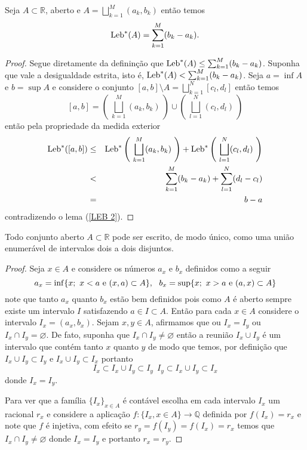 \begin{lema}\label{LEB 3}
Seja $A\subset \mathbb{R}$,  aberto e $A=\bigsqcup_{k=1}^M(a_k,b_k)$ então temos 
$$
\textnormal{Leb}^{*}(A)=\sum_{k=1}^M(b_k-a_k).
$$
\end{lema}

\begin{proof}
Segue diretamente da defininção que 
$\textnormal{Leb}^{*}(A)\leq\sum_{k=1}^M(b_k-a_k)$. 
Suponha que vale a desigualdade estrita, 
isto é, $\textnormal{Leb}^{*}(A)<\sum_{k=1}^M(b_k-a_k)$. 
Seja $a=\inf A$ e $b=\sup A$
e considere o conjunto $[a,b]\setminus A=\bigsqcup_{k=1}^{N}[c_l,d_l]$ 
então temos
$$
[a,b]=\left(~\bigsqcup_{k=1}^M(a_k,b_k)~\right)
\cup \left(~\bigsqcup_{l=1}^{N}(c_l,d_l)~\right)
$$
então pela propriedade da medida exterior 
\begin{eqnarray*}
\textnormal{Leb}^{*}([a,b])
&\leq &
\textnormal{Leb}^*\left(~\bigsqcup_{k=1}^M(a_k,b_k)~\right)
+\textnormal{Leb}^*\left(~\bigsqcup_{l=1}^{N}(c_l,d_l)~\right)
\\
&
<
&
\sum_{k=1}^{M} (b_k-a_k)+\sum_{l=1}^N(d_l-c_l)
\\
&
=
&
b-a
\end{eqnarray*}
contradizendo o lema (\ref{LEB 2}).

\end{proof}



\begin{proposicao}
Todo conjunto aberto $A\subset \mathbb{R}$ pode ser 
escrito, de modo único, como uma união enumerável de 
intervalos dois a dois disjuntos.
\end{proposicao}


\begin{proof}
Seja $x\in A$  e considere os números $a_x$ e $b_x$ 
definidos como a seguir
$$
a_x
=
\inf\{x;~x<a~\textnormal{e}~(x,a)\subset A\},~~b_x
=
\sup \{x;~x>a~\textnormal{e}~(a,x)\subset A\}
$$
note que  tanto $a_x$ quanto $b_x$ estão bem definidos 
pois como $A$ é  aberto sempre existe um intervalo $I$ 
satisfazendo $a\in I\subset A$. 
Então para cada $x\in A$ considere o intervalo 
$I_x=(a_x,b_x)$. Sejam $x,y\in A$, afirmamos que ou $I_x=I_y$ 
ou $I_x\cap I_y=\varnothing.$ 
De fato, suponha que $I_x\cap I_y\neq \varnothing$ 
então a reunião $I_x\cup I_y$ é um intervalo que 
contém tanto $x$ quanto $y$ de modo que temos, 
por definição que $  I_ x\cup I_y\subset I_y$ 
e $I_x\cup I_y\subset I_x$ portanto 
$$
I_x\subset I_x\cup I_y\subset I_y~~ I_y\subset I_x\cup I_y\subset I_x
$$
donde $I_x=I_y$.



Para ver que a família $\{I_x\}_{x\in A}$ é 
contável escolha em cada intervalo $I_x$ um 
racional $r_x$ e considere a aplicação  
$f:\{I_x,x\in A\}\to \mathbb{Q}$ definida por 
$f(I_x)=r_x$ e note que $f$ é injetiva, com efeito se 
$r_y=f(I_y)=f(I_x)=r_x$ temos que 
$I_x\cap I_y\neq \varnothing$ donde $I_x=I_y$ e portanto $r_x=r_y$.

\end{proof}




